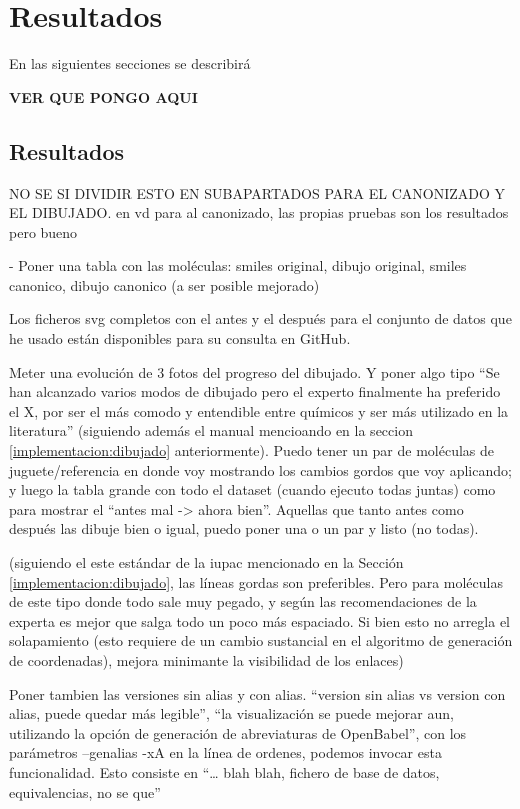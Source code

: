
\chapter{Resultados}

En las siguientes secciones se describirá 

\textbf{VER QUE PONGO AQUI}

\section{Resultados}
NO SE SI DIVIDIR ESTO EN SUBAPARTADOS PARA EL CANONIZADO Y EL DIBUJADO. en vd para al canonizado, las propias pruebas son los resultados pero bueno

- Poner una tabla con las moléculas: smiles original, dibujo original, smiles canonico, dibujo canonico (a ser posible mejorado)

Los ficheros svg completos con el antes y el después para el conjunto de datos que he usado están disponibles para su consulta en GitHub.

Meter una evolución de 3 fotos del progreso del dibujado. Y poner algo tipo “Se han alcanzado varios modos de dibujado pero el experto finalmente ha preferido el X, por ser el más comodo y entendible entre químicos y ser más utilizado en la literatura” (siguiendo además el manual mencioando en la seccion \ref{implementacion:dibujado} anteriormente). Puedo tener un par de moléculas de juguete/referencia en donde voy mostrando los cambios gordos que voy aplicando; y luego la tabla grande con todo el dataset (cuando ejecuto todas juntas) como para mostrar el “antes mal -> ahora bien”. Aquellas que tanto antes como después las dibuje bien o igual, puedo poner una o un par y listo (no todas).

(siguiendo el este estándar de la iupac mencionado en la Sección \ref{implementacion:dibujado}, las líneas gordas son preferibles. Pero para moléculas de este tipo donde todo sale muy pegado, y según las recomendaciones de la experta es mejor que salga todo un poco más espaciado. Si bien esto no arregla el solapamiento (esto requiere de un cambio sustancial en el algoritmo de generación de coordenadas), mejora minimante la visibilidad de los enlaces)

Poner tambien las versiones sin alias y con alias. “version sin alias vs version con alias, puede quedar más legible”, “la visualización se puede mejorar aun, utilizando la opción de generación de abreviaturas de OpenBabel”, con los parámetros --genalias -xA en la línea de ordenes, podemos invocar esta funcionalidad. Esto consiste en “… blah blah, fichero de base de datos, equivalencias, no se que”

